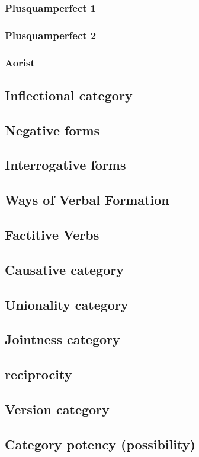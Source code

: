 \documentclass[a4paper,12pt]{book}
\newcommand{\1}[1]{\textbf{\emph{#1}}} %
\newcommand{\2}[1]{\textbf{[#1]}} %
\newcommand{\3}[1]{\fontsize{11pt}{0cm}\textbf{\emph{#1}}} %
\newcommand{\4}[1]{\fontsize{10pt}{0cm}\emph{#1}}	%
\newcommand{\5}[1]{\textbf{/#1/}} %
\newcommand{\6}[1]{\textbf{[#1]}} %
\newcommand{\7}[1]{\fontsize{12pt}{0cm}\emph{#1}} %
\newcommand{\8}[1]{\fontsize{12pt}{0cm}`#1'} %
\newcommand{\9}[1]{\fontsize{12pt}{0cm}(lit. `#1')} %
\begin{document}
\subsubsection{Plusquamperfect 1}
\subsubsection{Plusquamperfect 2}
\subsubsection{Aorist}
\subsection{Inflectional category}
\subsection{Negative forms}
\subsection{Interrogative forms}
\subsection{Ways of Verbal Formation}
\subsection{Factitive Verbs}
\subsection{Causative category}
\subsection{Unionality category}
\subsection{Jointness category}
\subsection{reciprocity}
\subsection{Version category}
\subsection{Category potency (possibility)}
\end{document}

